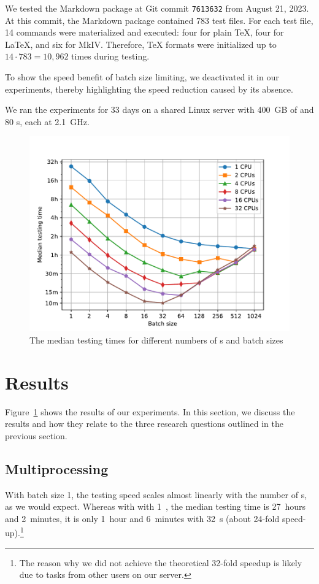 \documentclass[final]{ltugboat}
\begin{document}
We tested the Markdown package at Git commit \texttt{7613632} from August 21, 2023. At this commit, the Markdown package contained 783 test files. For each test file, 14 commands were materialized and executed: four for plain \TeX, four for \LaTeX, and six for  MkIV. Therefore, \TeX{} formats were initialized up to $14\cdot 783 = 10{,}962$ times during testing.

To show the speed benefit of batch size limiting, we deactivated it in our experiments, thereby highlighting the speed reduction caused by its absence.

We ran the experiments for 33 days on a shared Linux server with 400~GB of  and 80 s, each at 2.1~GHz.

\begin{figure}
\includegraphics[trim={0.5cm 0.3cm 1.6cm 1.4cm}, clip, width=\linewidth]{images/speed-tests}
\caption{The median testing times for different numbers of s and batch sizes}
\label{fig:results}
\end{figure}

\section{Results}
\label{sec:results}

Figure~\ref{fig:results} shows the results of our experiments. In this section, we discuss the results and how they relate to the three research questions outlined in the previous section.

\subsection{Multiprocessing}
With batch size 1, the testing speed scales almost linearly with the number of s, as we would expect. Whereas with with 1~, the median testing time is 27~hours and 2~minutes, it is only 1~hour and 6~minutes with 32~s (about 24-fold speed-up).\footnote{%
The reason why we did not achieve the theoretical 32-fold speedup is likely due to tasks from other users on our server.%
}
\end{document}
